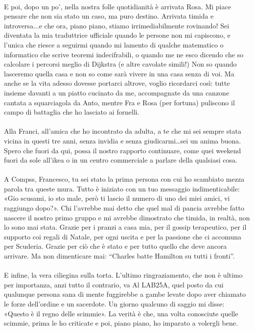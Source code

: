 \\E poi, dopo un po', nella nostra folle quotidianità è arrivata Rosa. Mi piace pensare che non sia stato un caso, ma puro destino. Arrivata timida e introversa...e che ora, piano piano, stiamo irrimediabilmente rovinando! Sei diventata la mia traduttrice ufficiale quando le persone non mi capiscono, e l'unica che riesce a seguirmi quando mi lamento di qualche matematico o informatico che scrive teoremi indecifrabili, o quando me ne esco dicendo che so calcolare i percorsi meglio di Dijkstra (e altre cavolate simili!)
Non so quando lasceremo quella casa e non so come sarà vivere in una casa senza di voi. Ma anche se la vita adesso dovesse portarci altrove, voglio ricordarci così: tutte insieme davanti a un piatto cucinato da me, accompagnate da una canzone cantata a squarciagola da Anto, mentre Fra e Rosa (per fortuna) puliscono il campo di battaglia che ho lasciato ai fornelli.
\\\\
Alla Franci, all’amica che ho incontrato da adulta, a te che mi sei sempre stata vicina in questi tre anni, senza invidia e senza giudicarmi…sei un anima buona. Spero che fuori da qui, possa il nostro rapporto continuare, come quei weekend fuori da sole all’ikea o in un centro commerciale a parlare della qualsiasi cosa.
\\\\
A Compss, Francesco, tu sei stato la prima persona con cui ho scambiato mezza parola tra queste mura. Tutto è iniziato con un tuo messaggio indimenticabile: «Gio scusami, io sto male, però ti lascio il numero di uno dei miei amici, vi raggiungo dopo?». Chi l'avrebbe mai detto che quel mal di pancia avrebbe fatto nascere il nostro primo gruppo e mi avrebbe dimostrato che timida, in realtà, non lo sono mai stata.
Grazie per i pranzi a casa mia, per il gossip terapeutico, per il supporto coi regali di Natale, per ogni uscita e per la passione che ci accomuna per Scuderia. Grazie per ciò che è stato e per tutto quello che deve ancora arrivare. Ma non dimenticare mai: “Charles batte Hamilton su tutti i fronti”.
\\\\
E infine, la vera ciliegina sulla torta. L’ultimo ringraziamento, che non è ultimo per importanza, anzi tutto il contrario, va 
Al LAB25A, quel posto da cui qualunque persona sana di mente fuggirebbe a gambe levate dopo aver chiamato le forze dell'ordine e un sacerdote. Un giorno qualcuno di saggio mi disse: «Questo è il regno delle scimmie». La verità è che, una volta conosciute quelle scimmie, prima le ho criticate e poi, piano piano, ho imparato a volergli bene.
